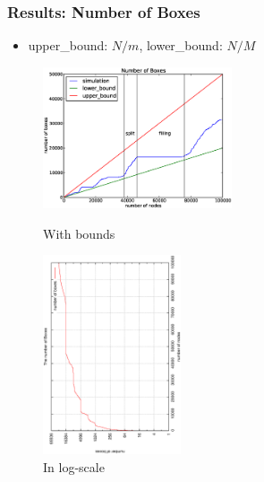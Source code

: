 \documentclass[red]{beamer}
\begin{document}
\begin{frame}
\frametitle{Results: Number of Boxes}
\begin{itemize}
\item upper\_bound: $N/m$, lower\_bound: $N/M$
\end{itemize}
\begin{figure}
\begin{minipage}{5cm}
\centering
\includegraphics[width=2.2in]{figs/no_box_100k.eps}
\caption{With bounds} 
\end{minipage}
\begin{minipage}{5cm}
\centering
\includegraphics[width=1.6in,angle=270]{figs/box_count_logy.eps}
\caption{In log-scale}
\end{minipage}
\end{figure}
\end{frame}
\end{document}
